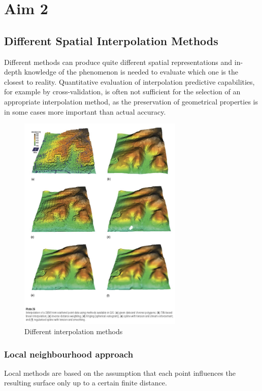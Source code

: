 \documentclass{article}
\begin{document}
\section{Aim 2}
\subsection{Different Spatial Interpolation Methods}
Different methods can produce quite different spatial representations and in-depth knowledge of the phenomenon is needed to evaluate which one is the closest to reality. Quantitative evaluation of interpolation predictive capabilities, for example by cross-validation, is often not sufficient for the selection of an appropriate interpolation method, as the preservation of geometrical properties is in some cases more important than actual accuracy.

\begin{figure}[h!]
    \centering
    \includegraphics[width=0.7\textwidth]{img/interpolation.jpg}
    \caption{Different interpolation methods}
    \label{fig:my_label}
\end{figure}

\subsubsection{Local neighbourhood approach}
Local methods are based on the assumption that each point influences the resulting surface only up to a certain finite distance.
\end{document}
